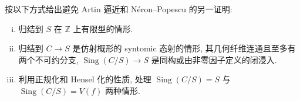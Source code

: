 \begin{exercise}\label{src:6.2.31}
按以下方式给出避免 Artin 逼近和 Néron--Popescu 的另一证明:
\begin{enumerate}[(i)]
\item 归结到 $S$ 在 $\mathbb Z$ 上有限型的情形.
\item 归结到 $C\to\allowbreak S$ 是仿射概形的 syntomic 态射的情形, 其几何纤维连通且至多有两个不可约分支, $\operatorname{Sing}(C/S)\to\allowbreak S$ 是同构或由非零因子定义的闭浸入.
\item 利用正规化和 Hensel 化的性质, 处理 $\operatorname{Sing}(C/S)=S$ 与 $\operatorname{Sing}(C/S)=V(f)$ 两种情形.
\end{enumerate}
\end{exercise}

